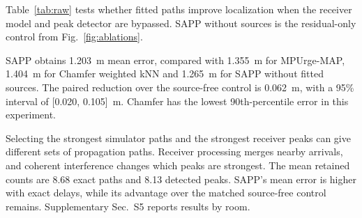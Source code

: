 Table~\ref{tab:raw} tests whether fitted paths improve localization when the receiver model and peak detector are bypassed. SAPP without sources is the residual-only control from Fig.~\ref{fig:ablations}.

SAPP obtains 1.203~m mean error, compared with 1.355~m for MPUrge-MAP, 1.404~m for Chamfer weighted kNN and 1.265~m for SAPP without fitted sources. The paired reduction over the source-free control is 0.062~m, with a 95\% interval of [0.020, 0.105]~m. Chamfer has the lowest 90th-percentile error in this experiment.

Selecting the strongest simulator paths and the strongest receiver peaks can give different sets of propagation paths. Receiver processing merges nearby arrivals, and coherent interference changes which peaks are strongest. The mean retained counts are 8.68 exact paths and 8.13 detected peaks. SAPP's mean error is higher with exact delays, while its advantage over the matched source-free control remains. Supplementary Sec.~S5 reports results by room.
